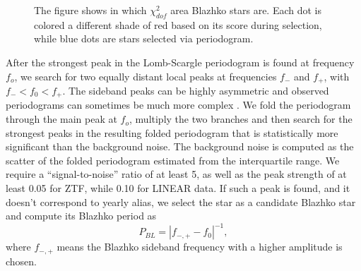 \begin{figure}[ht]
  \caption{The figure shows in which $\chi^2_{dof}$ area Blazhko stars are. Each dot is colored a different shade of red
  based on its score during selection, while blue dots are stars selected via periodogram.}
  \label{fig:chi_final}
  \end{figure}

After the strongest peak in the Lomb-Scargle periodogram is found at frequency $f_o$, we search for  two equally
distant local peaks at frequencies $f_-$ and $f_+$, with $f_- < f_0 < f_+$.  The sideband peaks can be highly asymmetric
\cite{2003ApJ...598..597A} and observed periodograms can sometimes be much more complex \cite{2007MNRAS.377.1263S}.  
We fold the periodogram through the main peak at $f_o$, multiply the two branches and then search for the strongest peaks
in the resulting folded periodogram that is statistically more significant than the background noise. The background noise
is computed as the scatter of the folded periodogram estimated from the interquartile range. We require a ``signal-to-noise''
ratio of at least 5, as well as the peak strength of at least 0.05 for ZTF, while 0.10 for LINEAR data. 
If such a peak is found,
and it doesn't correspond to yearly alias, we select the star as a candidate Blazhko star and compute
its Blazhko period as 
\begin{equation*}
P_{BL} = |f_{-,+} - f_0|^{-1},
\end{equation*}
where $f_{-,+}$ means the Blazhko sideband frequency with a higher amplitude is chosen. 

